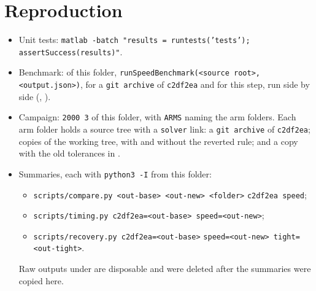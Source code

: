 \documentclass[11pt]{article}
\begin{document}
\section{Reproduction}
\begin{itemize}
\item Unit tests: \texttt{matlab -batch "results = runtests('tests'); assertSuccess(results)"}.
\item Benchmark:  of this folder,
  \texttt{runSpeedBenchmark(<source root>, <output.json>)}, for a
  \texttt{git archive} of \texttt{c2df2ea} and for this step, run side by
  side (, ).
\item Campaign:  \texttt{2000 3} of this
  folder, with \texttt{ARMS} naming the arm folders. Each arm folder holds a
  source tree with a \texttt{solver} link: a \texttt{git archive} of
  \texttt{c2df2ea}; copies of the working tree, with and without the reverted
  rule; and a copy with the old tolerances in
  .
\item Summaries, each with \texttt{python3 -I} from this folder:
  \begin{itemize}
  \item \texttt{scripts/compare.py <out-base> <out-new> <folder>}
    \texttt{c2df2ea speed};
  \item \texttt{scripts/timing.py c2df2ea=<out-base> speed=<out-new>};
  \item \texttt{scripts/recovery.py c2df2ea=<out-base>}
    \texttt{speed=<out-new> tight=<out-tight>}.
  \end{itemize}
  Raw outputs under 
  are disposable and were deleted after the summaries were copied here.
\end{itemize}
\end{document}

